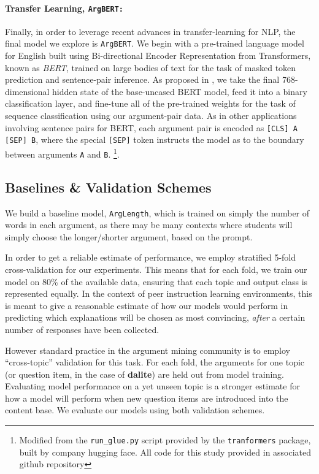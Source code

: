 \documentclass[runningheads]{llncs}
\begin{document}
\paragraph{\textbf{Transfer Learning, \tt{ArgBERT}:}}
Finally, in order to leverage recent advances in transfer-learning for NLP, the 
final model we explore is \verb|ArgBERT|.
We begin with a pre-trained language model for English built using  
Bi-directional Encoder Representation from Transformers, known as 
\textit{BERT}\cite{devlin_bert_2018}, trained on large bodies of text for the 
task of masked token prediction and sentence-pair inference. 
As proposed in \cite{toledo_automatic_2019}, we take the final 768-dimensional 
hidden state of the base-uncased BERT model, feed it into a binary 
classification layer, and fine-tune all of the pre-trained weights for the task 
of sequence classification using our argument-pair data. 
As in other applications involving sentence pairs for BERT, each argument pair 
is encoded as \verb|[CLS] A [SEP] B|, where the special \verb|[SEP]| token 
instructs the model as to the boundary between arguments \verb|A| and \verb|B|. 
\footnote{Modified from the \verb|run_glue.py| 
script provided by the \verb|tranformers| package, built by company hugging 
face. All code for this study provided in associated github repository}.

\subsection{Baselines \& Validation Schemes}

We build a baseline model, \verb|ArgLength|, which is trained 
on simply the number of words in each argument, as there may be many contexts 
where students will simply choose the longer/shorter argument, based on the 
prompt. 

In order to get a reliable estimate of performance, we employ stratified 5-fold 
cross-validation for our experiments.
This means that for each fold, we train our model on 80\% of the available 
data, ensuring that each topic and output class is represented equally. 
In the context of peer instruction learning environments, this is meant to give 
a reasonable estimate of how our models would perform in predicting which 
explanations will be chosen as most convincing, \textit{after} a certain number 
of responses have been collected.
 
However standard practice in the argument mining community is to employ 
``cross-topic'' validation for this task. 
For each fold, the arguments for one topic (or question item, in the case of 
\textbf{dalite}) are held out from model training.
Evaluating model performance on a yet unseen topic is a stronger estimate for 
how a model will perform when new question items are introduced into the 
content base.
We evaluate our models using both validation schemes.
\end{document}
